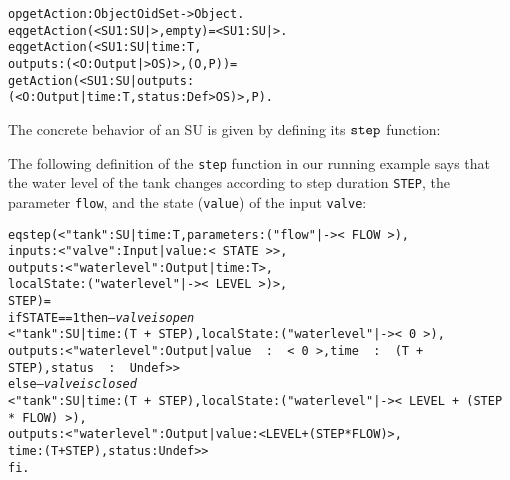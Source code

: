 \small
\begin{alltt}
  op getAction : Object OidSet -> Object .
  eq getAction(< SU1 : SU | >, empty) = < SU1 : SU | > .
  eq getAction(< SU1 : SU | time : T, 
                            outputs : (< O : Output | > OS) >, (O , P)) = 
     getAction(< SU1 : SU | outputs : 
                     (< O : Output | time : T, status : Def > OS) >, P) .
\end{alltt}
\normalsize



The concrete behavior of an SU is given by defining its $\mathtt{step}_{}$
function:

\begin{example}
The following definition of the \texttt{step} function in our running
example says that  the water level of the tank changes according to
step duration \texttt{STEP}, the parameter \texttt{flow}, and the
state (\texttt{value}) of the input \texttt{valve}:

\scriptsize
\begin{alltt}
eq step(< "tank" : SU | time : T, parameters : ("flow" |-> <\,FLOW\,>), 
                        inputs : < "valve" : Input | value : <\,STATE\,> >, 
                        outputs : < "waterlevel" : Output | time : T >,
                        localState : ("waterlevel" |-> <\,LEVEL\,>) >,
        STEP) = 
  if STATE == 1 then    \emph{--- valve is open}
    < "tank" : SU | time : (T\,+\,STEP), localState : ("waterlevel" |-> <\,0\,>),
          outputs : < "waterlevel" : Output | value\,\,:\,\,<\,0\,>, time\,\,:\,\,(T\,+\,STEP), status\,\,:\,\,Undef > >
  else                  \emph{--- valve is closed}
    < "tank" : SU | time : (T\,+\,STEP),  localState : ("waterlevel" |-> <\,LEVEL\,+\,(STEP\,*\,FLOW)\,>), 
                    outputs : < "waterlevel" : Output | value : < LEVEL + (STEP * FLOW) >, 
                                                        time : (T + STEP), status : Undef > > 
  fi .
\end{alltt}
\normalsize
\end{example}

